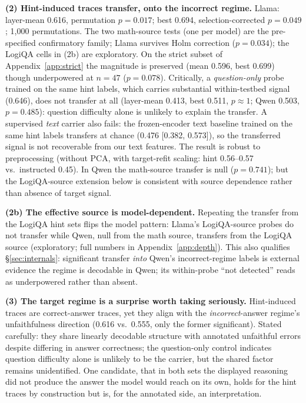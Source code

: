 \documentclass{article}
\begin{document}
\textbf{(2) Hint-induced traces transfer, onto the incorrect regime.} Llama: layer-mean 0.616, permutation $p{=}0.017$; best 0.694, selection-corrected $p{=}0.049$; 1{,}000 permutations. The two math-source tests (one per model) are the pre-specified confirmatory family; Llama survives Holm correction ($p{=}0.034$); the LogiQA cells in (2b) are exploratory. On the strict subset of Appendix~\ref{app:strict} the magnitude is preserved (mean 0.596, best 0.699) though underpowered at $n{=}47$ ($p{=}0.078$). Critically, a \emph{question-only} probe trained on the same hint labels, which carries substantial within-testbed signal (0.646), does not transfer at all (layer-mean 0.413, best 0.511, $p{\approx}1$; Qwen 0.503, $p{=}0.485$): question difficulty alone is unlikely to explain the transfer. A supervised \emph{text} carrier also fails: the frozen-encoder text baseline trained on the same hint labels transfers at chance (0.476 [0.382, 0.573]), so the transferred signal is not recoverable from our text features. The result is robust to preprocessing (without PCA, with target-refit scaling: hint 0.56--0.57 vs.\ instructed 0.45). In Qwen the math-source transfer is null ($p{=}0.741$); but the LogiQA-source extension below is consistent with source dependence rather than absence of target signal.

\textbf{(2b) The effective source is model-dependent.} Repeating the transfer from the LogiQA hint sets flips the model pattern: Llama's LogiQA-source probes do not transfer while Qwen, null from the math source, transfers from the LogiQA source (exploratory; full numbers in Appendix~\ref{app:depth}). This also qualifies \S\ref{sec:internals}: significant transfer \emph{into} Qwen's incorrect-regime labels is external evidence the regime is decodable in Qwen; its within-probe ``not detected'' reads as underpowered rather than absent.

\textbf{(3) The target regime is a surprise worth taking seriously.} Hint-induced traces are correct-answer traces, yet they align with the \emph{incorrect}-answer regime's unfaithfulness direction (0.616 vs.\ 0.555, only the former significant). Stated carefully: they share linearly decodable structure with annotated unfaithful errors despite differing in answer correctness; the question-only control indicates question difficulty alone is unlikely to be the carrier, but the shared factor remains unidentified. One candidate, that in both sets the displayed reasoning did not produce the answer the model would reach on its own, holds for the hint traces by construction but is, for the annotated side, an interpretation.
\end{document}
